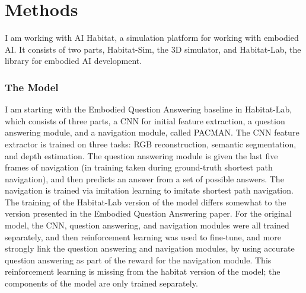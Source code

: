 \chapter{Methods}
I am working with AI Habitat, a simulation platform for working with embodied AI\cite{habitat19iccv}. It consists of two parts, Habitat-Sim, the 3D simulator, and Habitat-Lab, the library for embodied AI development. 

\subsection{The Model}
I am starting with the Embodied Question Answering baseline in Habitat-Lab, which consists of three parts, a CNN for initial feature extraction, a question answering module, and a navigation module, called PACMAN\cite{embodiedqa}.
The CNN feature extractor is trained on three tasks: RGB reconstruction, semantic segmentation, and depth estimation.
The question answering module is given the last five frames of navigation (in training taken during ground-truth shortest path navigation), and then predicts an answer from a set of possible answers. 
The navigation is trained via imitation learning to imitate shortest path navigation.  %
The training of the Habitat-Lab version of the model differs somewhat to the version presented in the Embodied Question Answering paper. For the original model, the CNN, question answering, and navigation modules were all trained separately, and then reinforcement learning was used to fine-tune, and more strongly link the question answering and navigation modules, by using accurate question answering %
as part of the reward for the navigation module. This reinforcement learning is missing from the habitat version of the model; the components of the model are only trained separately. 




